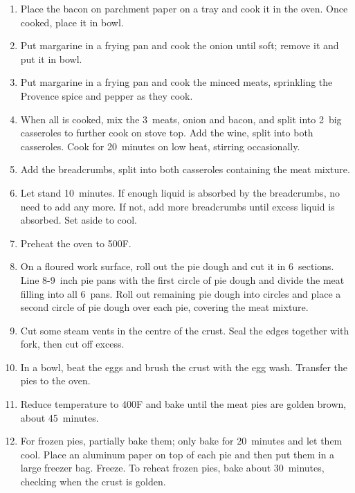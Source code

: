 \begin{enumerate}
    \item Place the bacon on parchment paper on a tray and cook it in the oven. Once cooked, place it in bowl.
    \item Put margarine in a frying pan and cook the onion until soft; remove it and put it in bowl.
    \item Put margarine in a frying pan and cook the minced meats, sprinkling the Provence spice and pepper as they cook.
    \item When all is cooked, mix the 3~meats, onion and bacon, and split into 2~big casseroles to further cook on stove top. Add the wine, split into both casseroles. Cook for 20~minutes on low heat, stirring occasionally.
    \item Add the breadcrumbs, split into both casseroles containing the meat mixture.
    \item Let stand 10~minutes. If enough liquid is absorbed by the breadcrumbs, no need to add any more. If not, add more breadcrumbs until excess liquid is absorbed. Set aside to cool.
    \item Preheat the oven to 500\degree F.
    \item On a floured work surface, roll out the pie dough and cut it in 6~sections. Line 8-9~inch pie pans with the first circle of pie dough and divide the meat filling into all 6~pans. Roll out remaining pie dough into circles and place a second circle of pie dough over each pie, covering the meat mixture.
    \item Cut some steam vents in the centre of the crust. Seal the edges together with fork, then cut off excess.
    \item In a bowl, beat the eggs and brush the crust with the egg wash. Transfer the pies to the oven.
    \item Reduce temperature to 400\degree F and bake until the meat pies are golden brown, about 45~minutes.
    \item For frozen pies, partially bake them; only bake for 20~minutes and let them cool. Place an aluminum paper on top of each pie and then put them in a large freezer bag. Freeze. To reheat frozen pies, bake about 30~minutes, checking when the crust is golden.
\end{enumerate}
